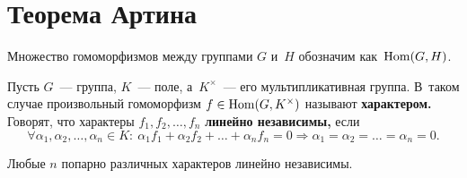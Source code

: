 \documentclass{article}
\begin{document}
\section{Теорема Артина}

Множество гомоморфизмов между группами $G$ и~$H$ обозначим как~$\mathrm{Hom}(G, H)$.

Пусть $G$~— группа, $K$~— поле, а~$K^{\times}$~— его мультипликативная группа.
В~таком случае произвольный гомоморфизм $f \in \mathrm{Hom}(G, K^{\times})$ называют \textbf{характером.}
Говорят, что характеры $f_1, f_2, \ldots, f_n$ \textbf{линейно независимы,}
если
$$
    \forall \alpha_1, \alpha_2, \ldots, \alpha_n \in K{:}\ \alpha_1 f_1 + \alpha_2 f_2 + \ldots + \alpha_n f_n = 0 \Rightarrow \alpha_1 = \alpha_2 = \ldots = \alpha_n = 0.
$$

\begin{theorem*}[Артин]
    Любые $n$ попарно различных характеров линейно независимы.
\end{theorem*}
\end{document}
